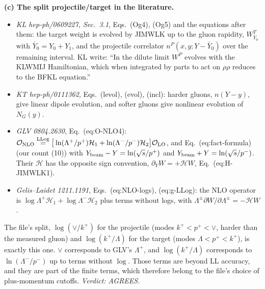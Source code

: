 \medskip\noindent\textbf{(c) The split projectile/target in the literature.}
\begin{itemize}
\item \emph{KL hep-ph/0609227, Sec.~3.1}, Eqs.~(Og4), (Og5) and the equations after them: the target weight is evolved by JIMWLK up to the gluon rapidity, $W^T_{\bar Y_0}$ with $\bar Y_0=Y_0+Y_1$, and the projectile correlator $n^P(x,y;Y-\bar Y_0)$ over the remaining interval. KL write: ``In the dilute limit $W^P$ evolves with the KLWMIJ Hamiltonian, which when integrated by parts to act on $\rho\rho$ reduces to the BFKL equation.''
\item \emph{KT hep-ph/0111362}, Eqs.~(levol), (evol), (incl): harder gluons, $n(Y-y)$, give linear dipole evolution, and softer gluons give nonlinear evolution of $N_G(y)$.
\item \emph{GLV 0804.2630}, Eq.~(eq:O-NLO4): ${\cal O}_{\rm NLO}\stackrel{\rm LLog}{=}\big[\ln(\Lambda^+/p^+)\mathcal H_1+\ln(\Lambda^-/p^-)\mathcal H_2\big]{\cal O}_{\rm LO}$, and Eq.~(eq:fact-formula) (our count (10)) with $Y_{\rm beam}-Y=\ln(\sqrt s/p^+)$ and $Y_{\rm beam}+Y=\ln(\sqrt s/p^-)$. Their $\mathcal H$ has the opposite sign convention, $\partial_YW=+\mathcal HW$, Eq.~(eq:H-JIMWLK1).
\item \emph{Gelis--Laidet 1211.1191}, Eqs.~(eq:NLO-logs), (eq:g-LLog): the NLO operator is $\log\Lambda^+\mathcal H_1+\log\Lambda^-\mathcal H_2$ plus terms without logs, with $\Lambda^\pm\partial W/\partial\Lambda^\pm=-\mathcal HW$.
\end{itemize}
The file's split, $\log(\vee/k^+)$ for the projectile (modes $k^+<p^+<\vee$, harder than the measured gluon) and $\log(k^+/\Lambda)$ for the target (modes $\Lambda<p^+<k^+$), is exactly this one. $\vee$ corresponds to GLV's $\Lambda^+$, and $\log(k^+/\Lambda)$ corresponds to $\ln(\Lambda^-/p^-)$ up to terms without $\log$. Those terms are beyond LL accuracy, and they are part of the finite terms, which therefore belong to the file's choice of plus-momentum cutoffs. \emph{Verdict: AGREES.}


